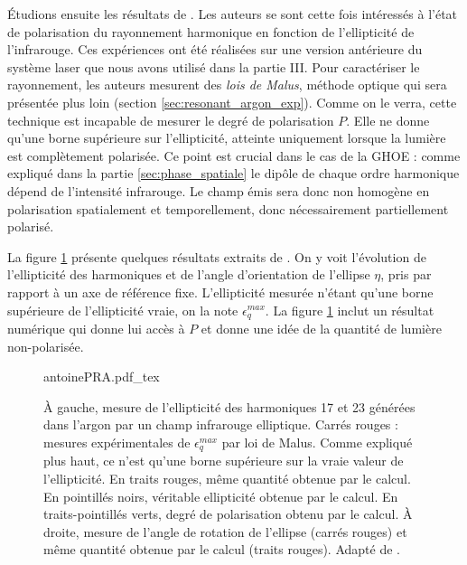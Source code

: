 \'{E}tudions ensuite les résultats de . Les auteurs se sont cette fois intéressés à l'état de polarisation du rayonnement harmonique en fonction de l'ellipticité de l'infrarouge. Ces expériences ont été réalisées sur une version antérieure du système laser que nous avons utilisé dans la partie III. Pour caractériser le rayonnement, les auteurs mesurent des \textit{lois de Malus}, méthode optique qui sera présentée plus loin (section \ref{sec:resonant_argon_exp}). Comme on le verra, cette technique est incapable de mesurer le degré de polarisation $P$. Elle ne donne qu'une borne supérieure sur l'ellipticité, atteinte uniquement lorsque la lumière est complètement polarisée. Ce point est crucial dans le cas de la GHOE : comme expliqué dans la partie \ref{sec:phase_spatiale} le dipôle de chaque ordre harmonique dépend de l'intensité infrarouge. Le champ émis sera donc non homogène en polarisation spatialement et temporellement, donc nécessairement partiellement polarisé.

La figure \ref{fig:antoinepra} présente quelques résultats extraits de . On y voit l'évolution de l'ellipticité des harmoniques et de l'angle d'orientation de l'ellipse $\eta$, pris par rapport à un axe de référence fixe. L'ellipticité mesurée n'étant qu'une borne supérieure de l'ellipticité vraie, on la note $\epsilon^{max}_q$. La figure \ref{fig:antoinepra} inclut un résultat numérique qui donne lui accès à $P$ et donne une idée de la quantité de lumière non-polarisée.

\begin{figure}[!ht]
\centering
\def\svgwidth{\columnwidth}
{antoinePRA.pdf_tex}
\caption{\`{A} gauche, mesure de l'ellipticité des harmoniques 17 et 23 générées dans l'argon par un champ infrarouge elliptique. Carrés rouges : mesures expérimentales de $\epsilon^{max}_q$ par loi de Malus. Comme expliqué plus haut, ce n'est qu'une borne supérieure sur la vraie valeur de l'ellipticité. En traits rouges, même quantité obtenue par le calcul. En pointillés noirs, véritable ellipticité obtenue par le calcul. En traits-pointillés verts, degré de polarisation obtenu par le calcul. \`{A} droite, mesure de l'angle de rotation de l'ellipse (carrés rouges) et même quantité obtenue par le calcul (traits rouges). Adapté de .}
\label{fig:antoinepra}
\end{figure}

